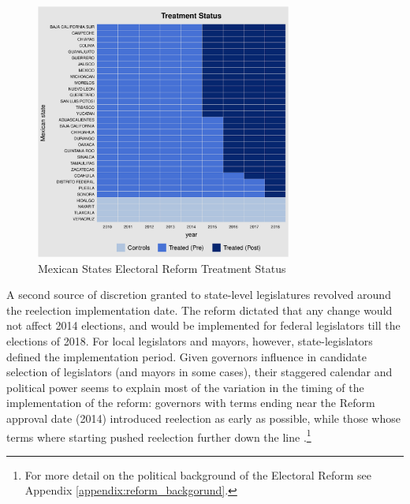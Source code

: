 \documentclass[12pt]{amsart}
\numberwithin{equation}{section}
\theoremstyle{definition}
\theoremstyle{definition}
\theoremstyle{definition}
\begin{document}
\begin{figure}[h]   
\centering 
\caption{Mexican States Electoral Reform Treatment Status}
\label{fig:treatment_status}
\includegraphics[width=0.75\textwidth]{../Figures/reform_treatmentstatus.pdf}     
\captionsetup{justification=centering} 
\end{figure}   
 
    
A second source of discretion granted to state-level legislatures revolved around the reelection implementation date. The reform dictated that any change would not affect 2014 elections, and would be implemented for federal legislators till the elections of 2018. For local legislators and mayors, however, state-legislators defined the implementation period. Given governors influence in candidate selection of legislators (and mayors in some cases), their staggered calendar and political power seems to explain most of the variation in the timing of the implementation of the reform: governors with terms ending near the Reform approval date (2014) introduced reelection as early as possible, while those whose terms where starting pushed reelection further down the line \citep{motolinia_2020}.\footnote{For more detail on the political background of the Electoral Reform see Appendix \ref{appendix:reform_backgorund}.}
   
\end{document}

